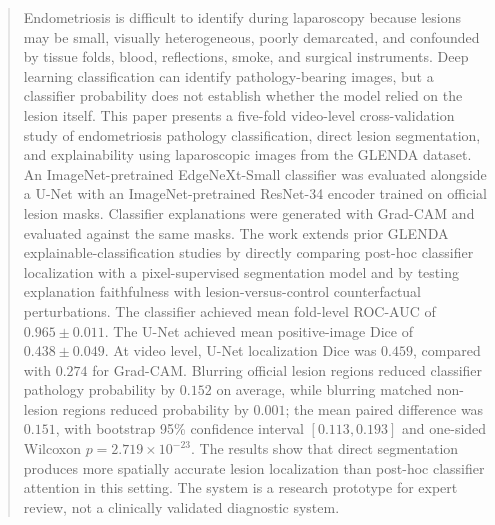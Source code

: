 \author{
}

\maketitle

\begin{abstract}
Endometriosis is difficult to identify during laparoscopy because lesions may be small, visually heterogeneous, poorly demarcated, and confounded by tissue folds, blood, reflections, smoke, and surgical instruments. Deep learning classification can identify pathology-bearing images, but a classifier probability does not establish whether the model relied on the lesion itself. This paper presents a five-fold video-level cross-validation study of endometriosis pathology classification, direct lesion segmentation, and explainability using laparoscopic images from the GLENDA dataset. An ImageNet-pretrained EdgeNeXt-Small classifier was evaluated alongside a U-Net with an ImageNet-pretrained ResNet-34 encoder trained on official lesion masks. Classifier explanations were generated with Grad-CAM and evaluated against the same masks. The work extends prior GLENDA explainable-classification studies by directly comparing post-hoc classifier localization with a pixel-supervised segmentation model and by testing explanation faithfulness with lesion-versus-control counterfactual perturbations. The classifier achieved mean fold-level ROC-AUC of $0.965 \pm 0.011$. The U-Net achieved mean positive-image Dice of $0.438 \pm 0.049$. At video level, U-Net localization Dice was $0.459$, compared with $0.274$ for Grad-CAM. Blurring official lesion regions reduced classifier pathology probability by $0.152$ on average, while blurring matched non-lesion regions reduced probability by $0.001$; the mean paired difference was $0.151$, with bootstrap 95\% confidence interval $[0.113,0.193]$ and one-sided Wilcoxon $p=2.719\times10^{-23}$. The results show that direct segmentation produces more spatially accurate lesion localization than post-hoc classifier attention in this setting. The system is a research prototype for expert review, not a clinically validated diagnostic system.
\end{abstract}

